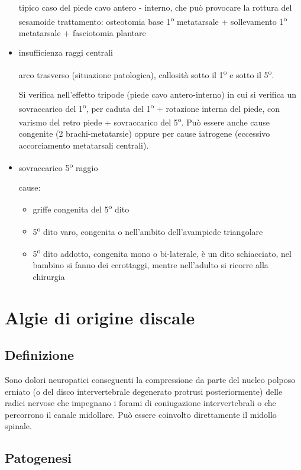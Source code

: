 \begin{itemize}
tipico caso del piede cavo antero - interno, che può provocare la rottura del sesamoide trattamento: osteotomia base 1\textsuperscript{o} metatarsale +
sollevamento 1\textsuperscript{o} metatarsale + fasciotomia plantare

\item insufficienza raggi centrali

arco trasverso (situazione patologica), callosità sotto il 1\textsuperscript{o} e sotto il 5\textsuperscript{o}.

Si verifica nell'effetto tripode (piede cavo antero-interno) in cui si verifica un sovraccarico del 1\textsuperscript{o}, per caduta del 1\textsuperscript{o} + rotazione interna del piede, con varismo del retro piede + sovraccarico del 5\textsuperscript{o}. Può essere
anche cause congenite (2 brachi-metatarsie) oppure per cause iatrogene (eccessivo accorciamento metatarsali centrali).

\item sovraccarico 5\textsuperscript{o} raggio

cause:
\begin{itemize}
\item griffe congenita del 5\textsuperscript{o} dito
\item 5\textsuperscript{o} dito varo, congenita o nell'ambito dell'avampiede triangolare
\item 5\textsuperscript{o} dito addotto, congenita mono o bi-laterale, è un dito schiacciato, nel bambino si fanno dei cerottaggi, mentre nell'adulto si ricorre alla
chirurgia
\end{itemize}
\end{itemize}


\section{Algie di origine discale}

\subsection{Definizione} 
Sono dolori neuropatici conseguenti la compressione da parte del nucleo polposo erniato (o del disco intervertebrale degenerato protrusi posteriormente) delle radici nervose che impegnano i forami di coniugazione intervertebrali o che percorrono il canale midollare. Può essere coinvolto direttamente il midollo spinale.

\subsection{Patogenesi}

